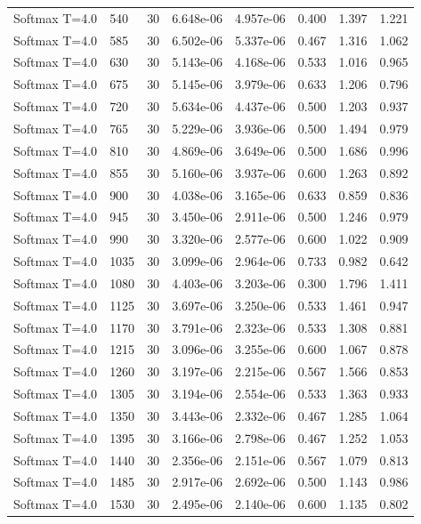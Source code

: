 \begin{scriptsize}
\begin{longtable}{llrrrrrr}
Softmax T=4.0 & 540 & 30 & 6.648e-06 & 4.957e-06 & 0.400 & 1.397 & 1.221 \\
Softmax T=4.0 & 585 & 30 & 6.502e-06 & 5.337e-06 & 0.467 & 1.316 & 1.062 \\
Softmax T=4.0 & 630 & 30 & 5.143e-06 & 4.168e-06 & 0.533 & 1.016 & 0.965 \\
Softmax T=4.0 & 675 & 30 & 5.145e-06 & 3.979e-06 & 0.633 & 1.206 & 0.796 \\
Softmax T=4.0 & 720 & 30 & 5.634e-06 & 4.437e-06 & 0.500 & 1.203 & 0.937 \\
Softmax T=4.0 & 765 & 30 & 5.229e-06 & 3.936e-06 & 0.500 & 1.494 & 0.979 \\
Softmax T=4.0 & 810 & 30 & 4.869e-06 & 3.649e-06 & 0.500 & 1.686 & 0.996 \\
Softmax T=4.0 & 855 & 30 & 5.160e-06 & 3.937e-06 & 0.600 & 1.263 & 0.892 \\
Softmax T=4.0 & 900 & 30 & 4.038e-06 & 3.165e-06 & 0.633 & 0.859 & 0.836 \\
Softmax T=4.0 & 945 & 30 & 3.450e-06 & 2.911e-06 & 0.500 & 1.246 & 0.979 \\
Softmax T=4.0 & 990 & 30 & 3.320e-06 & 2.577e-06 & 0.600 & 1.022 & 0.909 \\
Softmax T=4.0 & 1035 & 30 & 3.099e-06 & 2.964e-06 & 0.733 & 0.982 & 0.642 \\
Softmax T=4.0 & 1080 & 30 & 4.403e-06 & 3.203e-06 & 0.300 & 1.796 & 1.411 \\
Softmax T=4.0 & 1125 & 30 & 3.697e-06 & 3.250e-06 & 0.533 & 1.461 & 0.947 \\
Softmax T=4.0 & 1170 & 30 & 3.791e-06 & 2.323e-06 & 0.533 & 1.308 & 0.881 \\
Softmax T=4.0 & 1215 & 30 & 3.096e-06 & 3.255e-06 & 0.600 & 1.067 & 0.878 \\
Softmax T=4.0 & 1260 & 30 & 3.197e-06 & 2.215e-06 & 0.567 & 1.566 & 0.853 \\
Softmax T=4.0 & 1305 & 30 & 3.194e-06 & 2.554e-06 & 0.533 & 1.363 & 0.933 \\
Softmax T=4.0 & 1350 & 30 & 3.443e-06 & 2.332e-06 & 0.467 & 1.285 & 1.064 \\
Softmax T=4.0 & 1395 & 30 & 3.166e-06 & 2.798e-06 & 0.467 & 1.252 & 1.053 \\
Softmax T=4.0 & 1440 & 30 & 2.356e-06 & 2.151e-06 & 0.567 & 1.079 & 0.813 \\
Softmax T=4.0 & 1485 & 30 & 2.917e-06 & 2.692e-06 & 0.500 & 1.143 & 0.986 \\
Softmax T=4.0 & 1530 & 30 & 2.495e-06 & 2.140e-06 & 0.600 & 1.135 & 0.802 \\

\end{longtable}
\end{scriptsize}
